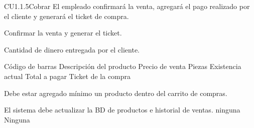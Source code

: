 \begin{UseCase} {CU1.1.5}{Cobrar}{
	El empleado confirmará la venta, agregará el pago realizado por el cliente y generará el ticket de compra.
}








	
	{
	}
	{
		Confirmar la venta y generar el ticket.
	}
	{
		
		\UCli Cantidad de dinero entregada por el cliente.
	}
	{
		\UCli Código de barras 
		\UCli Descripción del producto
		\UCli Precio de venta
		\UCli Piezas
		\UCli Existencia actual
		\UCli Total a pagar
		\UCli Ticket de la compra
	}

	{
		\UCli Debe estar agregado mínimo un producto dentro del carrito de compras.

	}
	{
		El sistema debe actualizar la BD de productos e historial de ventas.
	}
	{
		ninguna
	}
	{
		Ninguna
	}
\end{UseCase}

